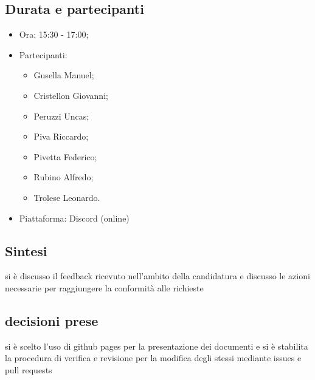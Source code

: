 \documentclass[12pt]{article}
\begin{document}
\subsection{Durata e partecipanti}
\begin{itemize}
\item Ora: 15:30 - 17:00;
\item Partecipanti: 	
	\begin{itemize}
	\item Gusella Manuel;
	\item Cristellon Giovanni;
	\item Peruzzi Uncas;
	\item Piva Riccardo;
	\item Pivetta Federico;
	\item Rubino Alfredo;
	\item Trolese Leonardo.
	\end{itemize}
\item Piattaforma: Discord (online)
\end{itemize}
\subsection{Sintesi}
si è discusso il feedback ricevuto nell'ambito della candidatura e discusso le azioni necessarie per raggiungere la conformità alle richieste
\subsection{decisioni prese}
si è scelto l'uso di github pages per la presentazione dei documenti e si è stabilita la procedura di verifica e revisione per la modifica degli stessi mediante issues e pull requests
\end{document}
